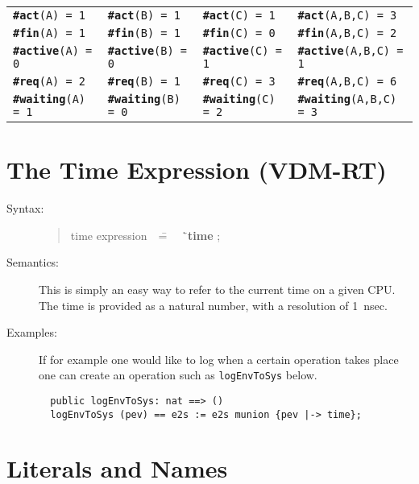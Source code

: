 \documentclass{overturerepchap}
\newcommand{\Rule}[2]{
  \begin{quote}\begin{tabbing}
    #1\index{#1}\ \ \= = \ \ \= #2  ; %

  \end{tabbing}\end{quote}
  }
\newcommand{\Lop}[1]{`{\bf\ttfamily #1}\Quote}
\begin{document}
{\begin{center}\small
\begin{tabular}{llll}
\texttt{{\bf\ttfamily \#act}(A) = 1} & \texttt{{\bf\ttfamily \#act}(B) = 1} & \texttt{{\bf\ttfamily \#act}(C) = 1}
& \texttt{{\bf\ttfamily \#act}(A,B,C) = 3}\\
\texttt{{\bf\ttfamily \#fin}(A) = 1} & \texttt{{\bf\ttfamily \#fin}(B) = 1} & \texttt{{\bf\ttfamily \#fin}(C) = 0}
& \texttt{{\bf\ttfamily \#fin}(A,B,C) = 2}\\
\texttt{{\bf\ttfamily \#active}(A) = 0} & \texttt{{\bf\ttfamily \#active}(B) = 0} &
\texttt{{\bf\ttfamily \#active}(C) = 1} & \texttt{{\bf\ttfamily \#active}(A,B,C) = 1}\\
\texttt{{\bf\ttfamily \#req}(A) = 2} & \texttt{{\bf\ttfamily \#req}(B) = 1} & \texttt{{\bf\ttfamily \#req}(C) = 3}
& \texttt{{\bf\ttfamily \#req}(A,B,C) = 6}\\
\texttt{{\bf\ttfamily \#waiting}(A) = 1} & \texttt{{\bf\ttfamily \#waiting}(B) = 0} &
\texttt{{\bf\ttfamily \#waiting}(C) = 2} & \texttt{{\bf\ttfamily \#waiting}(A,B,C) = 3}\\
\end{tabular}
\end{center}


\section{The Time Expression (VDM-RT)}\label{sec:time}

\begin{description}
\item[Syntax:]
 \Rule{time expression}{\Lop{time}}

\item[Semantics:] This is simply an easy way to refer to the current time on
     a given CPU. The time is provided as a natural number, with a resolution of 1~nsec.
\item[Examples:] If for example one would like to log when a certain operation takes place one can create an operation such as \texttt{logEnvToSys} below.
\begin{lstlisting}
  public logEnvToSys: nat ==> ()
  logEnvToSys (pev) == e2s := e2s munion {pev |-> time};
\end{lstlisting}
\end{description}


\section{Literals and Names}

}
\end{document}
